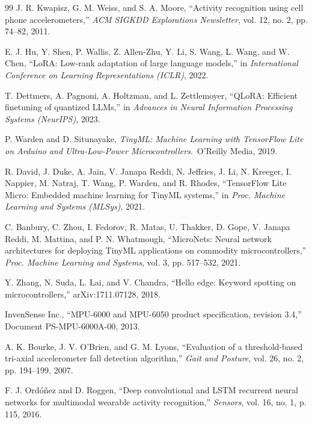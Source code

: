 \documentclass[conference]{IEEEtran}
\begin{document}
\begin{thebibliography}{99}
J. R. Kwapisz, G. M. Weiss, and S. A. Moore, ``Activity recognition using cell phone accelerometers,'' \emph{ACM SIGKDD Explorations Newsletter}, vol. 12, no. 2, pp. 74--82, 2011.

E. J. Hu, Y. Shen, P. Wallis, Z. Allen-Zhu, Y. Li, S. Wang, L. Wang, and W. Chen, ``LoRA: Low-rank adaptation of large language models,'' in \emph{International Conference on Learning Representations (ICLR)}, 2022.

T. Dettmers, A. Pagnoni, A. Holtzman, and L. Zettlemoyer, ``QLoRA: Efficient finetuning of quantized LLMs,'' in \emph{Advances in Neural Information Processing Systems (NeurIPS)}, 2023.

P. Warden and D. Situnayake, \emph{TinyML: Machine Learning with TensorFlow Lite on Arduino and Ultra-Low-Power Microcontrollers}.\ O'Reilly Media, 2019.

R. David, J. Duke, A. Jain, V. Janapa Reddi, N. Jeffries, J. Li, N. Kreeger, I. Nappier, M. Natraj, T. Wang, P. Warden, and R. Rhodes, ``TensorFlow Lite Micro: Embedded machine learning for TinyML systems,'' in \emph{Proc. Machine Learning and Systems (MLSys)}, 2021.

C. Banbury, C. Zhou, I. Fedorov, R. Matas, U. Thakker, D. Gope, V. Janapa Reddi, M. Mattina, and P. N. Whatmough, ``MicroNets: Neural network architectures for deploying TinyML applications on commodity microcontrollers,'' \emph{Proc. Machine Learning and Systems}, vol. 3, pp. 517--532, 2021.

Y. Zhang, N. Suda, L. Lai, and V. Chandra, ``Hello edge: Keyword spotting on microcontrollers,'' arXiv:1711.07128, 2018.

InvenSense Inc., ``MPU-6000 and MPU-6050 product specification, revision 3.4,'' Document PS-MPU-6000A-00, 2013.

A. K. Bourke, J. V. O'Brien, and G. M. Lyons, ``Evaluation of a threshold-based tri-axial accelerometer fall detection algorithm,'' \emph{Gait and Posture}, vol. 26, no. 2, pp. 194--199, 2007.

F. J. Ord{\'o}{\~n}ez and D. Roggen, ``Deep convolutional and LSTM recurrent neural networks for multimodal wearable activity recognition,'' \emph{Sensors}, vol. 16, no. 1, p. 115, 2016.

\end{thebibliography}
\end{document}
